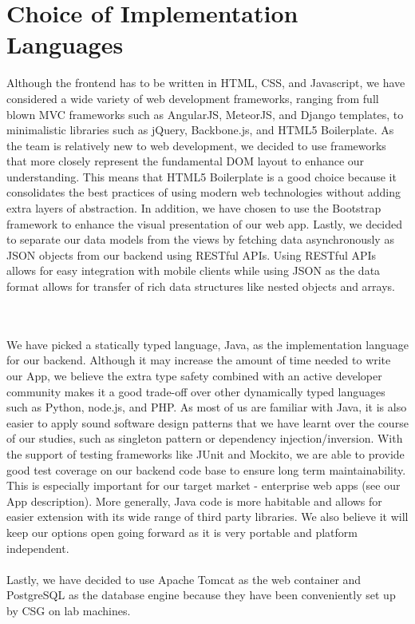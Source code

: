 \documentclass[10pt,a4paper]{article}
\begin{document}
\section{Choice of Implementation Languages}
Although the frontend has to be written in HTML, CSS, and Javascript, we have considered a wide variety of web development frameworks, ranging from full blown MVC frameworks such as AngularJS, MeteorJS, and Django templates, to minimalistic libraries such as jQuery, Backbone.js, and HTML5 Boilerplate. As the team is relatively new to web development, we decided to use frameworks that more closely represent the fundamental DOM layout to enhance our understanding. This means that HTML5 Boilerplate is a good choice because it consolidates the best practices of using modern web technologies without adding extra layers of abstraction. In addition, we have chosen to use the Bootstrap framework to enhance the visual presentation of our web app. Lastly, we decided to separate our data models from the views by fetching data asynchronously as JSON objects from our backend using RESTful APIs. Using RESTful APIs allows for easy integration with mobile clients while using JSON as the data format allows for transfer of rich data structures like nested objects and arrays.

\\
\\
\noindent
We have picked a statically typed language, Java, as the implementation language for our backend. Although it may increase the amount of time needed to write our App, we believe the extra type safety combined with an active developer community makes it a good trade-off over other dynamically typed languages such as Python, node.js, and PHP. As most of us are familiar with Java, it is also easier to apply sound software design patterns that we have learnt over the course of our studies, such as singleton pattern or dependency injection/inversion. With the support of testing frameworks like JUnit and Mockito, we are able to provide good test coverage on our backend code base to ensure long term maintainability. This is especially important for our target market - enterprise web apps (see our App description). More generally, Java code is more habitable and allows for easier extension with its wide range of third party libraries. We also believe it will keep our options open going forward as it is very portable and platform independent.
\\
\\
\noindent
Lastly, we have decided to use Apache Tomcat as the web container and PostgreSQL as the database engine because they have been conveniently set up by CSG on lab machines.
\end{document}
